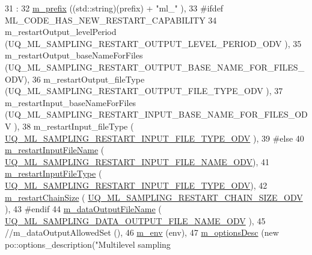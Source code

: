 \begin{DoxyCode}
31   :
32   \hyperlink{class_q_u_e_s_o_1_1_m_l_sampling_options_a1d3d48598e0b59b46337ce66a52671a5}{m\_prefix}                               ((std::string)(prefix) + \textcolor{stringliteral}{"ml\_"}                        ),
33 \textcolor{preprocessor}{#ifdef ML\_CODE\_HAS\_NEW\_RESTART\_CAPABILITY}
34 \textcolor{preprocessor}{}  m\_restartOutput\_levelPeriod            (UQ\_ML\_SAMPLING\_RESTART\_OUTPUT\_LEVEL\_PERIOD\_ODV       ),
35   m\_restartOutput\_baseNameForFiles       (UQ\_ML\_SAMPLING\_RESTART\_OUTPUT\_BASE\_NAME\_FOR\_FILES\_ODV),
36   m\_restartOutput\_fileType               (UQ\_ML\_SAMPLING\_RESTART\_OUTPUT\_FILE\_TYPE\_ODV          ),
37   m\_restartInput\_baseNameForFiles        (UQ\_ML\_SAMPLING\_RESTART\_INPUT\_BASE\_NAME\_FOR\_FILES\_ODV ),
38   m\_restartInput\_fileType                (
      \hyperlink{_m_l_sampling_options_8h_a018a972ab4b4e38509e010f4b3223fb1}{UQ\_ML\_SAMPLING\_RESTART\_INPUT\_FILE\_TYPE\_ODV}           ),
39 \textcolor{preprocessor}{#else}
40 \textcolor{preprocessor}{}  \hyperlink{class_q_u_e_s_o_1_1_m_l_sampling_options_aff68336a5d6ae4160e541975260450d8}{m\_restartInputFileName}                 (
      \hyperlink{_m_l_sampling_options_8h_a17088af1520e38f78034a6a9d729dff4}{UQ\_ML\_SAMPLING\_RESTART\_INPUT\_FILE\_NAME\_ODV}),
41   \hyperlink{class_q_u_e_s_o_1_1_m_l_sampling_options_aae8adcb5188369ea144d2144b53cde48}{m\_restartInputFileType}                 (
      \hyperlink{_m_l_sampling_options_8h_a018a972ab4b4e38509e010f4b3223fb1}{UQ\_ML\_SAMPLING\_RESTART\_INPUT\_FILE\_TYPE\_ODV}),
42   \hyperlink{class_q_u_e_s_o_1_1_m_l_sampling_options_a073caa3483cbca881934842451412681}{m\_restartChainSize}                     (
      \hyperlink{_m_l_sampling_options_8h_a68cd0922499c632ff3ff44abb4df797e}{UQ\_ML\_SAMPLING\_RESTART\_CHAIN\_SIZE\_ODV}     ),
43 \textcolor{preprocessor}{#endif}
44 \textcolor{preprocessor}{}  \hyperlink{class_q_u_e_s_o_1_1_m_l_sampling_options_a2507c0e8b86f9d6f07a3f5609593fc96}{m\_dataOutputFileName}                   (
      \hyperlink{_m_l_sampling_options_8h_a08071d6c8f72010522ac64f4268b699a}{UQ\_ML\_SAMPLING\_DATA\_OUTPUT\_FILE\_NAME\_ODV}  ),
45 \textcolor{comment}{//m\_dataOutputAllowedSet                 (),}
46   \hyperlink{class_q_u_e_s_o_1_1_m_l_sampling_options_a28d73f222e9b20f1c749ed808f69eebd}{m\_env}                                  (env),
47   \hyperlink{class_q_u_e_s_o_1_1_m_l_sampling_options_afc13079420db3e2c7eaf97ca4d44cc97}{m\_optionsDesc}                          (\textcolor{keyword}{new} po::options\_description(\textcolor{stringliteral}{"Multilevel sampling
}
\end{DoxyCode}
